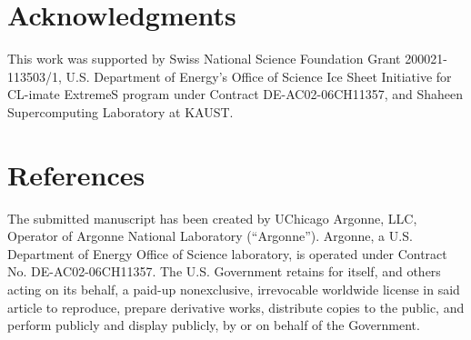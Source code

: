 \documentclass[3p]{elsarticle}
\begin{document}
\section*{Acknowledgments} This work was supported by Swiss National Science Foundation Grant 200021-113503/1, U.S. Department of Energy's Office of Science Ice Sheet Initiative for CL-imate ExtremeS program under Contract DE-AC02-06CH11357, and Shaheen Supercomputing Laboratory at KAUST.

\section*{References}




The submitted manuscript has been created by UChicago Argonne, LLC,
Operator of Argonne National Laboratory (``Argonne'').  Argonne, a
U.S. Department of Energy Office of Science laboratory, is operated
under Contract No. DE-AC02-06CH11357.  The U.S. Government retains for
itself, and others acting on its behalf, a paid-up nonexclusive,
irrevocable worldwide license in said article to reproduce, prepare
derivative works, distribute copies to the public, and perform
publicly and display publicly, by or on behalf of the Government.
\end{document}
